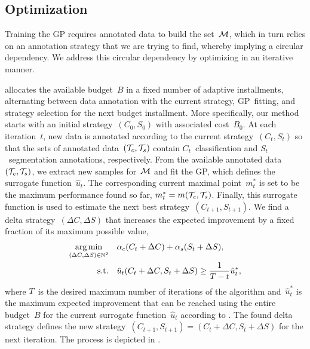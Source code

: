 \subsection{Optimization}

Training the GP requires annotated data to build the set~$\mathcal{M}$, which in turn relies on an annotation strategy that we are trying to find, whereby implying a circular dependency. We address this circular dependency by optimizing  in an iterative manner.

 allocates the available budget~$B$ in a fixed number of adaptive installments, alternating between data annotation with the current strategy, GP~fitting, and strategy selection for the next budget installment. More specifically, our method starts with an initial strategy~$(C_0, S_0)$ with associated cost~$B_0$. At each iteration~$t$, new data is annotated according to the current strategy~$(C_t, S_t)$ so that the sets of annotated data~$(\mathcal{T}_c, \mathcal{T}_s)$ contain $C_t$~classification and $S_t$~segmentation annotations, respectively. From the available annotated data~$(\mathcal{T}_c, \mathcal{T}_s)$, we extract new samples for~$\mathcal{M}$ and fit the GP, which defines the surrogate function~$\hat{u}_t$. The corresponding current maximal point~$m^*_t$ is set to be the maximum performance found so far, $m^*_t=m(\mathcal{T}_c, \mathcal{T}_s)$. Finally, this surrogate function is used to estimate the next best strategy~$(C_{t+1}, S_{t+1})$. We find a delta strategy~$(\Delta{}C,\Delta{}S)$ that increases the expected improvement by a fixed fraction of its maximum possible value,
\begin{equation}
\begin{aligned}
    \operatorname*{arg\,min}_{(\Delta{}C,\Delta{}S)\in\mathbb{N}^2} \quad & \alpha_c (C_t + \Delta{}C)+\alpha_s (S_t + \Delta{}S), \\
    \textrm{s.t.} \quad & \hat{u}_t(C_t + \Delta{}C, S_t + \Delta{}S) \ge \dfrac{1}{T - t}\hat{u}^*_t,
\end{aligned}
\label{eq:delta_strategy}
\end{equation}
where $T$~is the desired maximum number of iterations of the algorithm and~$\hat{u}_t^*$ is the maximum expected improvement that can be reached using the entire budget~$B$ for the current surrogate function~$\hat{u}_t$ according to . The found delta strategy defines the new strategy~$(C_{t+1}, S_{t+1}) = (C_t + \Delta{}C, S_t + \Delta{}S)$ for the next iteration. The process is depicted in .

